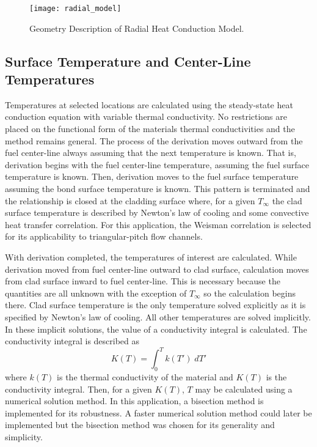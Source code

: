     \begin{figure}
      \centering
      \texttt{[image: radial\_model]}
      \caption{Geometry Description of Radial Heat Conduction Model.}
      \label{fig:radial_model}
    \end{figure}


  \subsection{Surface Temperature and Center-Line Temperatures}
    \label{sec:surface_temps}
    Temperatures at selected locations are calculated using the steady-state
    heat conduction equation with variable thermal conductivity. No restrictions
    are placed on the functional form of the materials thermal conductivities
    and the method remains general. The process of the derivation moves outward
    from the fuel center-line always assuming that the next temperature is
    known. That is, derivation begins with the fuel center-line temperature,
    assuming the fuel surface temperature is known. Then, derivation moves to
    the fuel surface temperature assuming the bond surface temperature is known.
    This pattern is terminated and the relationship is closed at the cladding
    surface where, for a given $T_{\infty}$ the clad surface temperature is
    described by Newton's law of cooling and some convective heat transfer
    correlation. For this application, the Weisman correlation is selected for
    its applicability to triangular-pitch flow channels.

    With derivation completed, the temperatures of interest are calculated.
    While derivation moved from fuel center-line outward to clad surface,
    calculation moves from clad surface inward to fuel center-line. This is
    necessary because the quantities are all unknown with the exception of
    $T_{\infty}$ so the calculation begins there. Clad surface temperature is 
    the only temperature solved explicitly as it is specified by Newton's law of
    cooling. All other temperatures are solved implicitly. In these implicit
    solutions, the value of a conductivity integral is calculated. The 
    conductivity integral is described as
    \begin{equation}
      \label{eq:conductivity_integral}
      K(T) = \int_0^T k(T') \; dT'
    \end{equation}
    where $k(T)$ is the thermal conductivity of the material and $K(T)$ is the
    conductivity integral. Then, for a given $K(T)$, $T$ may be calculated using
    a numerical solution method. In this application, a bisection method is 
    implemented for its robustness. A faster numerical solution method could 
    later be implemented but the bisection method was chosen for its generality
    and simplicity.

